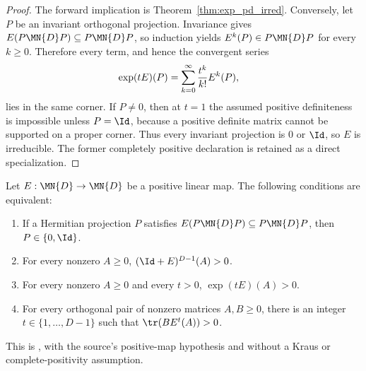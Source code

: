 \begin{proof}\leanok
    The forward implication is Theorem~\ref{thm:exp_pd_irred}. Conversely,
    let $P$ be an invariant orthogonal projection. Invariance gives
    $E(P\MN{D}P)\subseteq P\MN{D}P$, so induction yields
    $E^k(P)\in P\MN{D}P$ for every $k\geq0$. Therefore every term, and hence
    the convergent series
    \begin{align}
        \exp(tE)(P)
         & =\sum_{k=0}^{\infty}\frac{t^k}{k!}E^k(P),
        \notag
    \end{align}
    lies in the same corner. If $P\neq0$, then at $t=1$ the assumed positive
    definiteness is impossible unless $P=\Id$, because a positive definite
    matrix cannot be supported on a proper corner. Thus every invariant
    projection is $0$ or $\Id$, so $E$ is irreducible. The former completely
    positive declaration is retained as a direct specialization.
\end{proof}

\begin{theorem}
    \label{thm:wolf_6_2}
    \leanok
    Let $E:\MN{D}\to\MN{D}$ be a positive linear map. The following
    conditions are equivalent:
    \begin{enumerate}
        \item If a Hermitian projection $P$ satisfies
              $E(P\MN{D}P)\subseteq P\MN{D}P$, then
              $P\in\{0,\Id\}$.
        \item For every nonzero $A\geq0$,
              $(\Id+E)^{D-1}(A)>0$.
        \item For every nonzero $A\geq0$ and every $t>0$,
              $\exp(tE)(A)>0$.
        \item For every orthogonal pair of nonzero matrices $A,B\geq0$,
              there is an integer $t\in\{1,\ldots,D-1\}$ such that
              $\tr(BE^t(A))>0$.
    \end{enumerate}
    This is \cite[Theorem~6.2]{Wolf2012Quantum}, with the source's positive-map
    hypothesis and without a Kraus or complete-positivity assumption.
\end{theorem}


